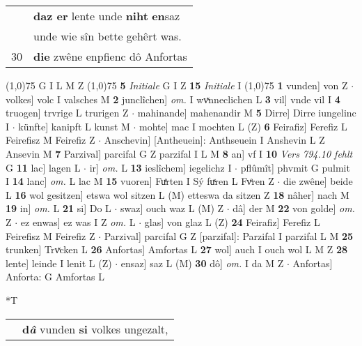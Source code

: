 \documentclass[8pt,a4paper,notitlepage]{article}
\begin{document}
\begin{table}[ht]
\begin{minipage}[t]{0.5\linewidth}
\begin{tabular}{rl}
 & \textbf{daz er} lente unde \textbf{niht} \textbf{en}saz\\ 
 & unde wie sîn bette gehêrt was.\\ 
30 & \textbf{die} zwêne enpfienc dô Anfortas\\ 
\end{tabular}
\scriptsize
\line(1,0){75} \newline
G I L M Z \newline
\line(1,0){75} \newline
\textbf{5} \textit{Initiale} G I Z  \textbf{15} \textit{Initiale} I  \newline
\line(1,0){75} \newline
\textbf{1} vunden] von Z  $\cdot$ volkes] volc I valsches M \textbf{2} junclîchen] \textit{om.} I wvͯnneclichen L \textbf{3} vil] vnde vil I \textbf{4} truogen] trvrige L trurigen Z  $\cdot$ mahinande] mahenandir M \textbf{5} Dirre] Dirre iungelinc I  $\cdot$ künfte] kanipft L kunst M  $\cdot$ mohte] mac I mochten L (Z) \textbf{6} Feirafiz] Ferefiz L Feirefisz M Feirefiz Z  $\cdot$ Anschevin] [Antheuein]: Anthseuein I Anshevin L Z Ansevin M \textbf{7} Parzival] parcifal G Z parzifal I L M \textbf{8} an] vf I \textbf{10} \textit{Vers 794.10 fehlt} G  \textbf{11} lac] lagen L  $\cdot$ ir] \textit{om.} L \textbf{13} ieslîchem] iegelichz I  $\cdot$ pflûmît] phvmit G pulmit I \textbf{14} lanc] \textit{om.} L lac M \textbf{15} vuoren] Fuͤrten I Sý fuͯren L Fvͤren Z  $\cdot$ die zwêne] beide L \textbf{16} wol gesitzen] etswa wol sitzen L (M) etteswa da sitzen Z \textbf{18} nâher] nach M \textbf{19} in] \textit{om.} L \textbf{21} si] Do L  $\cdot$ swaz] ouch waz L (M) Z  $\cdot$ dâ] der M \textbf{22} von golde] \textit{om.} Z  $\cdot$ ez enwas] ez was I Z \textit{om.} L  $\cdot$ glas] von glaz L (Z) \textbf{24} Feirafiz] Ferefiz L Feirefisz M Feirefiz Z  $\cdot$ Parzival] parcifal G Z [parzifal]: Parzifal I parzifal L M \textbf{25} trunken] Trvͯcken L \textbf{26} Anfortas] Amfortas L \textbf{27} wol] auch I ouch wol L M Z \textbf{28} lente] leinde I lenit L (Z)  $\cdot$ ensaz] saz L (M) \textbf{30} dô] \textit{om.} I da M Z  $\cdot$ Anfortas] Anforta: G Amfortas L \newline
\end{minipage}
\hspace{0.5cm}
\begin{minipage}[t]{0.5\linewidth}
\small
\begin{center}*T
\end{center}
\begin{tabular}{rl}
 & \textbf{d\textit{â}} vunden \textbf{si} volkes ungezalt,\\ 

\end{tabular}
\end{minipage}
\end{table}
\end{document}
